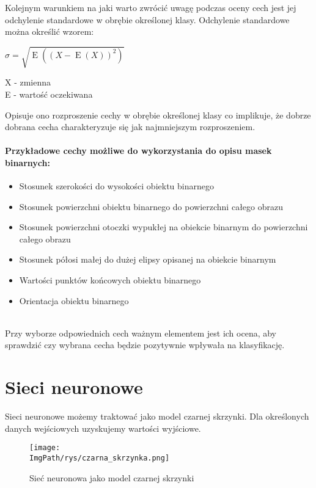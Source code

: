 \documentclass[a4paper,12pt,twoside,openany]{report}
\newcommand{\ImgPath}{.}
\begin{document}
Kolejnym warunkiem na jaki warto zwrócić uwagę podczas oceny cech jest jej odchylenie standardowe w obrębie określonej klasy. Odchylenie standardowe można określić wzorem: 
\begin{center}
	{\large $ \sigma = {\sqrt {\operatorname {E} ((X-\operatorname {E} (X))^{2})}} $ \par}
\end{center}
X - zmienna \\
E - wartość oczekiwana 


Opisuje ono rozproszenie cechy w obrębie określonej klasy co implikuje, że dobrze dobrana cecha charakteryzuje się jak najmniejszym rozproszeniem.

\paragraph{Przykładowe cechy możliwe do wykorzystania do opisu masek binarnych: }
\begin{itemize}
	\item Stosunek szerokości do wysokości obiektu binarnego
	\item Stosunek powierzchni obiektu binarnego do powierzchni całego obrazu
	\item Stosunek powierzchni otoczki wypukłej na obiekcie binarnym do powierzchni całego obrazu
	\item Stosunek półosi małej do dużej elipsy opisanej na obiekcie binarnym 
	\item Wartości punktów końcowych obiektu binarnego
	\item Orientacja obiektu binarnego
\end{itemize}
\mbox{} \\
Przy wyborze odpowiednich cech ważnym elementem jest ich ocena, aby sprawdzić czy wybrana cecha będzie pozytywnie wpływała na klasyfikację.

\section{Sieci neuronowe}
Sieci neuronowe możemy traktować jako model czarnej skrzynki. Dla określonych danych wejściowych uzyskujemy wartości wyjściowe.

\begin{figure}[H]	
	\centering
	\texttt{[image: \\ImgPath/rys/czarna\_skrzynka.png]}
	
	\caption{Sieć neuronowa jako model czarnej skrzynki}
\end{figure}
\end{document}
